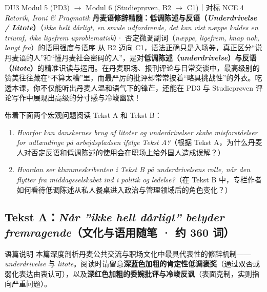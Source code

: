 {DU3 Modul 5 (PD3) $\rightarrow$ Modul 6 (Studieprøven, B2 $\rightarrow$ C1)｜对标 NCE 4 \textit{Retorik, Ironi \& Pragmatik}}
{\textbf{丹麦语修辞精髓：低调陈述与反语（\textit{Underdrivelse / Litote}）}（\textit{ikke helt dårligt, en smule udfordrende, det kan vist næppe kaldes en triumf, ikke ligefrem uproblematisk}）· 否定微调副词（\textit{næppe, ligefrem, knap nok, langt fra}）的语用强度与语序}
{从 B2 迈向 C1，语法正确只是入场券，真正区分“说丹麦语的人”和“懂丹麦社会密码的人”，是对\textbf{低调陈述（\textit{underdrivelse}）与反语（\textit{litote}）}的精准识读与运用。在丹麦职场、报刊评论与日常交谈中，最高级别的赞美往往藏在“不算太糟”里，而最严厉的批评却常常披着“略具挑战性”的外衣。吃透本课，你不仅能听出丹麦人温和语气下的锋芒，还能在 PD3 与 Studieprøven 评论写作中展现出高级的分寸感与冷峻幽默！}

\begin{foerduleaeser}
带着下面两个宏观问题阅读 Tekst A 和 Tekst B：
\begin{enumerate}
  \item \textit{Hvorfor kan danskernes brug af litoter og underdrivelser skabe misforståelser for udlændinge på arbejdspladsen ifølge Tekst A?}（根据 Tekst A，为什么丹麦人对否定反语和低调陈述的使用会在职场上给外国人造成误解？）
  \item \textit{Hvordan ser klummeskribenten i Tekst B på underdrivelsens rolle, når den flytter fra middagsselskabet ind i politik og ledelse?}（在 Tekst B 中，专栏作者如何看待低调陈述从私人餐桌进入政治与管理领域后的角色变化？）
\end{enumerate}
\end{foerduleaeser}


\subsection*{Tekst A：\textit{Når ”ikke helt dårligt” betyder fremragende}（文化与语用随笔 · 约 360 词）}

\begin{tipbox}{语篇说明}
本篇深度剖析丹麦公共交流与职场文化中最具代表性的修辞机制——\textit{underdrivelse} 与 \textit{litote}。阅读时请留意\textbf{\color{NCDNavy}深蓝色加粗的肯定性低调褒奖}（通过双否或弱化表达由衷认可），以及\textbf{\color{NCDRed}深红色加粗的委婉批评与冷峻反讽}（表面克制，实则指向严重问题）。
\end{tipbox}


